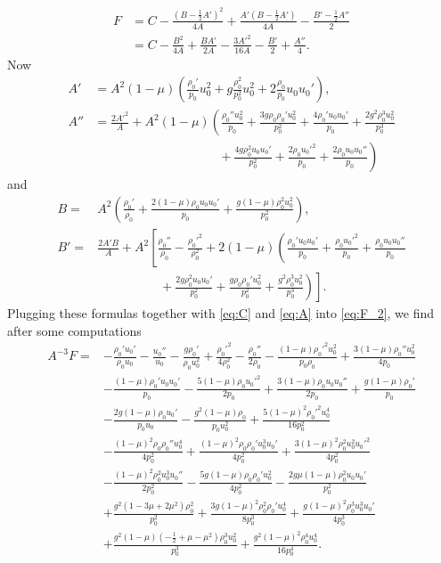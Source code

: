 \documentclass[11pt,twoside,reqno,centertags]{amsart}
\theoremstyle{definition}
\begin{document}
\begin{align}
	F&=C-\frac{(B-\frac12A')^2}{4A}+\frac{A'(B-\frac12A')}{4A}-\frac{B'-\frac12A''}{2}\nonumber\\
	&=C-\frac{B^2}{4A}+\frac{BA'}{2A}-\frac{3A'^2}{16A}-\frac{B'}{2}+\frac{A''}{4}.\label{eq:F_2}
\end{align}
Now
\begin{align*}
	A'&=A^2(1-\mu)\left(\frac{\rho_0'}{p_0}u_0^2+g\frac{\rho_0^2}{p_0^2}u_0^2+2\frac{\rho_0}{p_0}u_0u_0'\right),\\
	A''&=\frac{2A'^2}{A}+A^2(1-\mu)\left(\frac{\rho_0''u_0^2}{p_0}+\frac{3g\rho_0\rho_0'u_0^2}{p_0^2}+\frac{4\rho_0'u_0u_0'}{p_0}+\frac{2g^2\rho_0^3u_0^2}{p_0^3}\right.\\
	&\qquad\qquad\qquad\qquad\qquad\left.{}+\frac{4g\rho_0^2u_0u_0'}{p_0^2}+\frac{2\rho_0u_0'^2}{p_0}+\frac{2\rho_0u_0u_0''}{p_0}\right)
\end{align*}
and
\begin{align*}
	B={}&A^2\left(\frac{\rho_0'}{\rho_0}+\frac{2(1-\mu)\rho_0u_0u_0'}{p_0}+\frac{g(1-\mu)\rho_0^2u_0^2}{p_0^2}\right),\\
	B'={}&\frac{2A'B}{A}+A^2\left[\frac{\rho_0''}{\rho_0}-\frac{\rho_0'^2}{\rho_0^2}+2(1-\mu)\left(\frac{\rho_0'u_0u_0'}{p_0}+\frac{\rho_0u_0'^2}{p_0}+\frac{\rho_0u_0u_0''}{p_0}\right.\right.\\
	&\qquad\qquad\quad\left.\left.{}+\frac{2g\rho_0^2u_0u_0'}{p_0^2}+\frac{g\rho_0\rho_0'u_0^2}{p_0^2}+\frac{g^2\rho_0^3u_0^2}{p_0^3}\right)\right].
\end{align*}
Plugging these formulas together with \eqref{eq:C} and \eqref{eq:A} into \eqref{eq:F_2}, we find after some computations
\begin{align*}
	A^{-3}F={}&- \frac{\rho_0' u_0'}{\rho_0 u_0} - \frac{u_0''}{u_0} - \frac{g \rho_0'}{\rho_0 u_0^2} + \frac{\rho_0'^2}{4 \rho_0^2} - \frac{\rho_0''}{2 \rho_0} - \frac{(1-\mu) \rho_0'^2 u_0^2}{p_0 \rho_0} + \frac{3 (1-\mu) \rho_0'' u_0^2}{4 p_0}\\
	& - \frac{(1-\mu) \rho_0' u_0 u_0'}{p_0} - \frac{5 (1-\mu) \rho_0 u_0'^2}{2 p_0} + \frac{3 (1-\mu) \rho_0 u_0 u_0''}{2 p_0} + \frac{ g (1-\mu) \rho_0'}{p_0}\\
	& - \frac{2 g (1-\mu) \rho_0 u_0'}{p_0 u_0} - \frac{g^2 (1-\mu) \rho_0}{p_0 u_0^2} + \frac{5 (1-\mu) ^2 \rho_0'^2 u_0^4}{16 p_0^2}\\
	& - \frac{(1-\mu) ^2 \rho_0 \rho_0'' u_0^4}{4 p_0^2} + \frac{(1-\mu) ^2 \rho_0 \rho_0' u_0^3 u_0'}{4 p_0^2} + \frac{3 (1-\mu) ^2 \rho_0^2 u_0^2 u_0'^2}{4 p_0^2}\\
	& - \frac{(1-\mu) ^2 \rho_0^2 u_0^3 u_0''}{2 p_0^2} - \frac{5 g (1-\mu) \rho_0 \rho_0' u_0^2}{4 p_0^2} - \frac{2 g \mu (1-\mu) \rho_0^2 u_0 u_0'}{p_0^2}\\
	& + \frac{g^2 (1-3\mu+2\mu^2) \rho_0^2}{p_0^2} + \frac{3 g (1-\mu) ^2 \rho_0^2 \rho_0' u_0^4}{8 p_0^3} + \frac{g (1-\mu) ^2 \rho_0^3 u_0^3 u_0'}{4 p_0^3}\\
	& + \frac{g^2 (1-\mu) \left(-\frac12 + \mu - \mu^2\right) \rho_0^3 u_0^2}{p_0^3} + \frac{g^2 (1-\mu) ^2 \rho_0^4 u_0^4}{16p_0^4}.
\end{align*}
\end{document}
